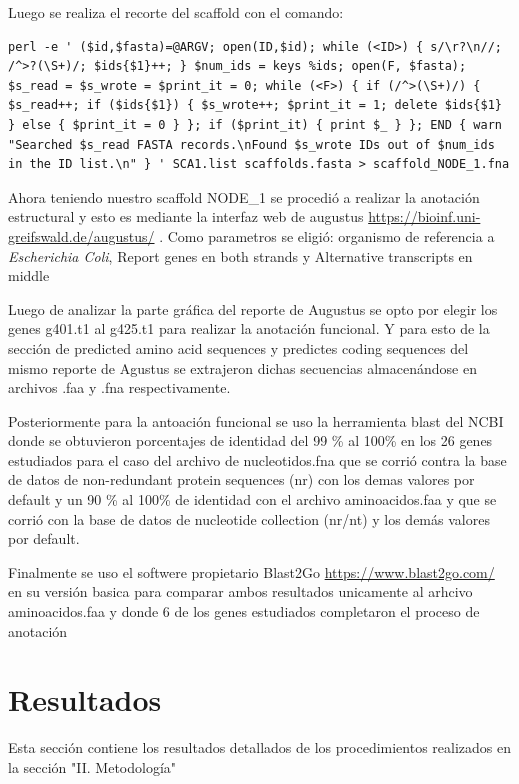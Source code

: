 \documentclass[journal, letterpaper, 11pt]{IEEEtran}
\begin{document}
Luego se realiza el recorte del scaffold con el comando:

\begin{lstlisting}[frame=single]
perl -e ' ($id,$fasta)=@ARGV; open(ID,$id); while (<ID>) { s/\r?\n//; /^>?(\S+)/; $ids{$1}++; } $num_ids = keys %ids; open(F, $fasta); $s_read = $s_wrote = $print_it = 0; while (<F>) { if (/^>(\S+)/) { $s_read++; if ($ids{$1}) { $s_wrote++; $print_it = 1; delete $ids{$1} } else { $print_it = 0 } }; if ($print_it) { print $_ } }; END { warn "Searched $s_read FASTA records.\nFound $s_wrote IDs out of $num_ids in the ID list.\n" } ' SCA1.list scaffolds.fasta > scaffold_NODE_1.fna
\end{lstlisting}

Ahora teniendo nuestro scaffold NODE\_1 se procedió a realizar la anotación estructural y esto es mediante la interfaz web de augustus \url{https://bioinf.uni-greifswald.de/augustus/} . Como parametros se eligió: organismo de referencia a \textit{Escherichia Coli}, Report genes en both strands y Alternative transcripts en middle

Luego de analizar la parte gráfica del reporte de Augustus se opto por elegir los genes g401.t1 al g425.t1 para realizar la anotación funcional. Y para esto de la sección de predicted amino acid sequences y predictes coding sequences del mismo reporte de Agustus se extrajeron dichas secuencias almacenándose en archivos .faa y .fna respectivamente. 

Posteriormente para la antoación funcional se uso la herramienta blast del NCBI donde se obtuvieron porcentajes de identidad del 99 \% al 100\% en los 26 genes estudiados para el caso del archivo de nucleotidos.fna que se corrió contra la base de datos de non-redundant protein sequences (nr) con los demas valores por default y un 90 \% al 100\% de identidad con el archivo aminoacidos.faa  y que se corrió con la base de datos de nucleotide collection (nr/nt) y los demás valores por default.

Finalmente se uso el softwere propietario Blast2Go \url{https://www.blast2go.com/} en su versión basica para comparar ambos resultados unicamente al arhcivo aminoacidos.faa y donde 6 de los genes estudiados completaron el proceso de anotación

\section{Resultados}
Esta sección contiene los resultados detallados de los procedimientos realizados en la sección "II. Metodología" \linebreak
\end{document}
